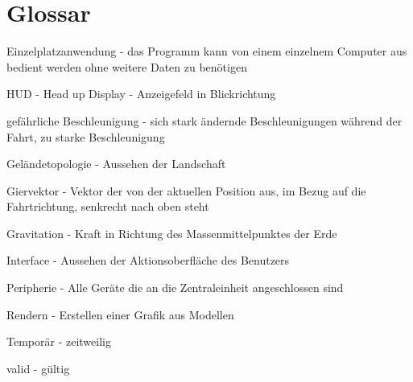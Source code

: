
\chapter{Glossar}

Einzelplatzanwendung - das Programm kann von einem einzelnem Computer aus bedient werden ohne weitere Daten zu benötigen

HUD  - Head up Display - Anzeigefeld in Blickrichtung

gefährliche Beschleunigung - sich stark ändernde Beschleunigungen während der Fahrt, zu starke Beschleunigung

Geländetopologie - Aussehen der Landschaft

Giervektor - Vektor der von der aktuellen Position aus, im Bezug auf die Fahrtrichtung, senkrecht nach oben steht

Gravitation - Kraft in Richtung des Massenmittelpunktes der Erde

Interface - Aussehen der Aktionsoberfläche des Benutzers 

Peripherie - Alle Geräte die an die Zentraleinheit angeschlossen sind

Rendern - Erstellen einer Grafik aus Modellen

Temporär - zeitweilig

valid - gültig


%

